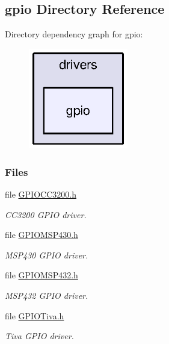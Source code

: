 \subsection{gpio Directory Reference}
\label{dir_fa84d3984843d6793bb3462042564560}
Directory dependency graph for gpio\+:
\nopagebreak
\begin{figure}[H]
\begin{center}
\leavevmode
\includegraphics[width=123pt]{dir_fa84d3984843d6793bb3462042564560_dep}
\end{center}
\end{figure}
\subsubsection*{Files}
\begin{DoxyCompactItemize}
\item 
file \hyperlink{_g_p_i_o_c_c3200_8h}{G\+P\+I\+O\+C\+C3200.\+h}
\begin{DoxyCompactList}\small\item\em C\+C3200 G\+P\+I\+O driver. \end{DoxyCompactList}\item 
file \hyperlink{_g_p_i_o_m_s_p430_8h}{G\+P\+I\+O\+M\+S\+P430.\+h}
\begin{DoxyCompactList}\small\item\em M\+S\+P430 G\+P\+I\+O driver. \end{DoxyCompactList}\item 
file \hyperlink{_g_p_i_o_m_s_p432_8h}{G\+P\+I\+O\+M\+S\+P432.\+h}
\begin{DoxyCompactList}\small\item\em M\+S\+P432 G\+P\+I\+O driver. \end{DoxyCompactList}\item 
file \hyperlink{_g_p_i_o_tiva_8h}{G\+P\+I\+O\+Tiva.\+h}
\begin{DoxyCompactList}\small\item\em Tiva G\+P\+I\+O driver. \end{DoxyCompactList}\end{DoxyCompactItemize}
